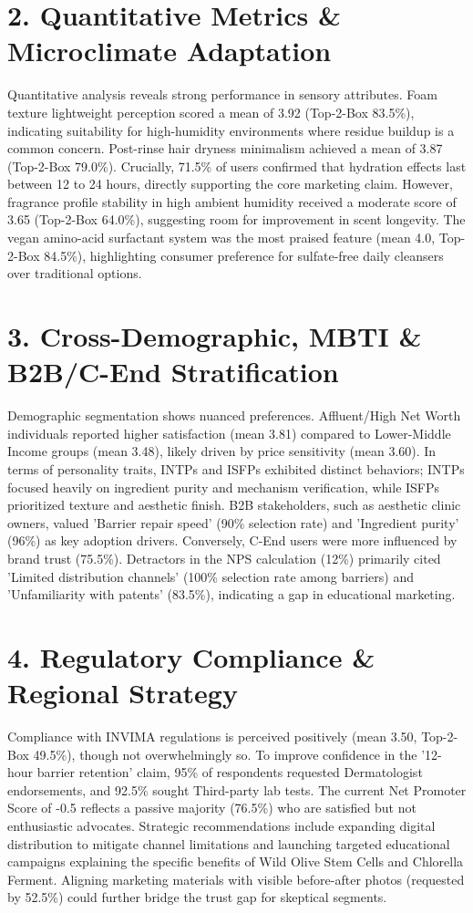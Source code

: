 \documentclass[10pt,twocolumn,a4paper]{article}
\begin{document}
\section{2. Quantitative Metrics \& Microclimate Adaptation}
Quantitative analysis reveals strong performance in sensory attributes. Foam texture lightweight perception scored a mean of 3.92 (Top-2-Box 83.5\%), indicating suitability for high-humidity environments where residue buildup is a common concern. Post-rinse hair dryness minimalism achieved a mean of 3.87 (Top-2-Box 79.0\%). Crucially, 71.5\% of users confirmed that hydration effects last between 12 to 24 hours, directly supporting the core marketing claim. However, fragrance profile stability in high ambient humidity received a moderate score of 3.65 (Top-2-Box 64.0\%), suggesting room for improvement in scent longevity. The vegan amino-acid surfactant system was the most praised feature (mean 4.0, Top-2-Box 84.5\%), highlighting consumer preference for sulfate-free daily cleansers over traditional options.
\section{3. Cross-Demographic, MBTI \& B2B/C-End Stratification}
Demographic segmentation shows nuanced preferences. Affluent/High Net Worth individuals reported higher satisfaction (mean 3.81) compared to Lower-Middle Income groups (mean 3.48), likely driven by price sensitivity (mean 3.60). In terms of personality traits, INTPs and ISFPs exhibited distinct behaviors; INTPs focused heavily on ingredient purity and mechanism verification, while ISFPs prioritized texture and aesthetic finish. B2B stakeholders, such as aesthetic clinic owners, valued 'Barrier repair speed' (90\% selection rate) and 'Ingredient purity' (96\%) as key adoption drivers. Conversely, C-End users were more influenced by brand trust (75.5\%). Detractors in the NPS calculation (12\%) primarily cited 'Limited distribution channels' (100\% selection rate among barriers) and 'Unfamiliarity with patents' (83.5\%), indicating a gap in educational marketing.
\section{4. Regulatory Compliance \& Regional Strategy}
Compliance with INVIMA regulations is perceived positively (mean 3.50, Top-2-Box 49.5\%), though not overwhelmingly so. To improve confidence in the '12-hour barrier retention' claim, 95\% of respondents requested Dermatologist endorsements, and 92.5\% sought Third-party lab tests. The current Net Promoter Score of -0.5 reflects a passive majority (76.5\%) who are satisfied but not enthusiastic advocates. Strategic recommendations include expanding digital distribution to mitigate channel limitations and launching targeted educational campaigns explaining the specific benefits of Wild Olive Stem Cells and Chlorella Ferment. Aligning marketing materials with visible before-after photos (requested by 52.5\%) could further bridge the trust gap for skeptical segments.
\end{document}
